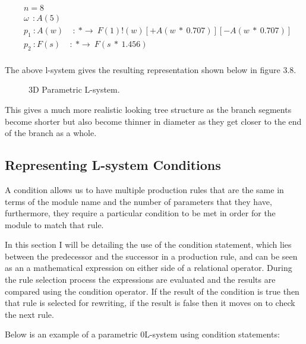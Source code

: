 \begin{equation} \label{parametric l-system practical}
\begin{aligned}
	&n=8 \\
	&\omega~~ : A(5)\\
	&p_1~ :  A(w)~~~~~ :~ * \rightarrow~ F(1)!(w)[+A(w~*~0.707)][-A(w~*~0.707)]\\
	&p_2~ :  F(s)~~~~~ :~ * \rightarrow~ F(s~*~1.456)\\
\end{aligned}
\end{equation}

The above l-system gives the resulting representation shown below in figure 3.8. 

\begin{figure}[htbp]
	{\centering
		\vspace{7px}
		\setlength{\fboxrule}{1pt}
		\caption{3D Parametric L-system.}
	}
\end{figure}
\FloatBarrier

\noindent
This gives a much more realistic looking tree structure as the branch segments become shorter but also become thinner in diameter as they get closer to the end of the branch as a whole. 

\subsection{Representing L-system Conditions} \label{Condition L-system Subsection}

A condition allows us to have multiple production rules that are the same in terms of the module name and the number of parameters that they have, furthermore, they require a particular condition to be met in order for the module to match that rule. 

In this section I will be detailing the use of the condition statement, which lies between the predecessor and the successor in a production rule, and can be seen as an a mathematical expression on either side of a relational operator. During the rule selection process the expressions are evaluated and the results are compared using the condition operator. If the result of the condition is true then that rule is selected for rewriting, if the result is false then it moves on to check the next rule. 


Below is an example of a parametric 0L-system using condition statements:

